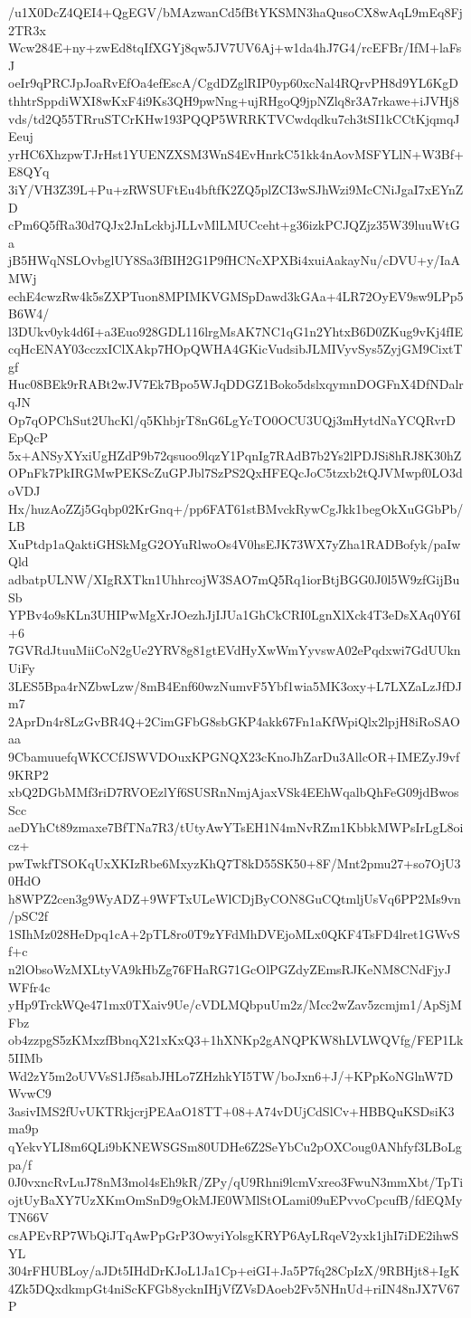 /u1X0DcZ4QEI4+QgEGV/bMAzwanCd5fBtYKSMN3haQusoCX8wAqL9mEq8Fj2TR3x
Wcw284E+ny+zwEd8tqIfXGYj8qw5JV7UV6Aj+w1da4hJ7G4/rcEFBr/IfM+laFsJ
oeIr9qPRCJpJoaRvEfOa4efEscA/CgdDZglRIP0yp60xcNal4RQrvPH8d9YL6KgD
thhtrSppdiWXI8wKxF4i9Ks3QH9pwNng+ujRHgoQ9jpNZlq8r3A7rkawe+iJVHj8
vds/td2Q55TRruSTCrKHw193PQQP5WRRKTVCwdqdku7ch3tSI1kCCtKjqmqJEeuj
yrHC6XhzpwTJrHst1YUENZXSM3WnS4EvHnrkC51kk4nAovMSFYLlN+W3Bf+E8QYq
3iY/VH3Z39L+Pu+zRWSUFtEu4bftfK2ZQ5plZCI3wSJhWzi9McCNiJgaI7xEYnZD
cPm6Q5fRa30d7QJx2JnLckbjJLLvMlLMUCceht+g36izkPCJQZjz35W39luuWtGa
jB5HWqNSLOvbglUY8Sa3fBIH2G1P9fHCNcXPXBi4xuiAakayNu/cDVU+y/IaAMWj
echE4cwzRw4k5sZXPTuon8MPIMKVGMSpDawd3kGAa+4LR72OyEV9sw9LPp5B6W4/
l3DUkv0yk4d6I+a3Euo928GDL116lrgMsAK7NC1qG1n2YhtxB6D0ZKug9vKj4fIE
cqHcENAY03cczxIClXAkp7HOpQWHA4GKicVudsibJLMIVyvSys5ZyjGM9CixtTgf
Huc08BEk9rRABt2wJV7Ek7Bpo5WJqDDGZ1Boko5dslxqymnDOGFnX4DfNDalrqJN
Op7qOPChSut2UhcKl/q5KhbjrT8nG6LgYcTO0OCU3UQj3mHytdNaYCQRvrDEpQcP
5x+ANSyXYxiUgHZdP9b72qsuoo9lqzY1PqnIg7RAdB7b2Ys2lPDJSi8hRJ8K30hZ
OPnFk7PkIRGMwPEKScZuGPJbl7SzPS2QxHFEQcJoC5tzxb2tQJVMwpf0LO3doVDJ
Hx/huzAoZZj5Gqbp02KrGnq+/pp6FAT61stBMvckRywCgJkk1begOkXuGGbPb/LB
XuPtdp1aQaktiGHSkMgG2OYuRlwoOs4V0hsEJK73WX7yZha1RADBofyk/paIwQld
adbatpULNW/XIgRXTkn1UhhrcojW3SAO7mQ5Rq1iorBtjBGG0J0l5W9zfGijBuSb
YPBv4o9sKLn3UHIPwMgXrJOezhJjIJUa1GhCkCRI0LgnXlXck4T3eDsXAq0Y6I+6
7GVRdJtuuMiiCoN2gUe2YRV8g81gtEVdHyXwWmYyvswA02ePqdxwi7GdUUknUiFy
3LES5Bpa4rNZbwLzw/8mB4Enf60wzNumvF5Ybf1wia5MK3oxy+L7LXZaLzJfDJm7
2AprDn4r8LzGvBR4Q+2CimGFbG8sbGKP4akk67Fn1aKfWpiQlx2lpjH8iRoSAOaa
9CbamuuefqWKCCfJSWVDOuxKPGNQX23cKnoJhZarDu3AllcOR+IMEZyJ9vf9KRP2
xbQ2DGbMMf3riD7RVOEzlYf6SUSRnNmjAjaxVSk4EEhWqalbQhFeG09jdBwosScc
aeDYhCt89zmaxe7BfTNa7R3/tUtyAwYTsEH1N4mNvRZm1KbbkMWPsIrLgL8oicz+
pwTwkfTSOKqUxXKIzRbe6MxyzKhQ7T8kD55SK50+8F/Mnt2pmu27+so7OjU30HdO
h8WPZ2cen3g9WyADZ+9WFTxULeWlCDjByCON8GuCQtmljUsVq6PP2Ms9vn/pSC2f
1SIhMz028HeDpq1cA+2pTL8ro0T9zYFdMhDVEjoMLx0QKF4TsFD4lret1GWvSf+c
n2lObsoWzMXLtyVA9kHbZg76FHaRG71GcOlPGZdyZEmsRJKeNM8CNdFjyJWFfr4c
yHp9TrckWQe471mx0TXaiv9Ue/cVDLMQbpuUm2z/Mcc2wZav5zcmjm1/ApSjMFbz
ob4zzpgS5zKMxzfBbnqX21xKxQ3+1hXNKp2gANQPKW8hLVLWQVfg/FEP1Lk5IIMb
Wd2zY5m2oUVVsS1Jf5sabJHLo7ZHzhkYI5TW/boJxn6+J/+KPpKoNGlnW7DWvwC9
3asivIMS2fUvUKTRkjcrjPEAaO18TT+08+A74vDUjCdSlCv+HBBQuKSDsiK3ma9p
qYekvYLI8m6QLi9bKNEWSGSm80UDHe6Z2SeYbCu2pOXCoug0ANhfyf3LBoLgpa/f
0J0vxncRvLuJ78nM3mol4sEh9kR/ZPy/qU9Rhni9lcmVxreo3FwuN3mmXbt/TpTi
ojtUyBaXY7UzXKmOmSnD9gOkMJE0WMlStOLami09uEPvvoCpcufB/fdEQMyTN66V
csAPEvRP7WbQiJTqAwPpGrP3OwyiYolsgKRYP6AyLRqeV2yxk1jhI7iDE2ihwSYL
304rFHUBLoy/aJDt5IHdDrKJoL1Ja1Cp+eiGI+Ja5P7fq28CpIzX/9RBHjt8+IgK
4Zk5DQxdkmpGt4niScKFGb8ycknIHjVfZVsDAoeb2Fv5NHnUd+riIN48nJX7V67P
